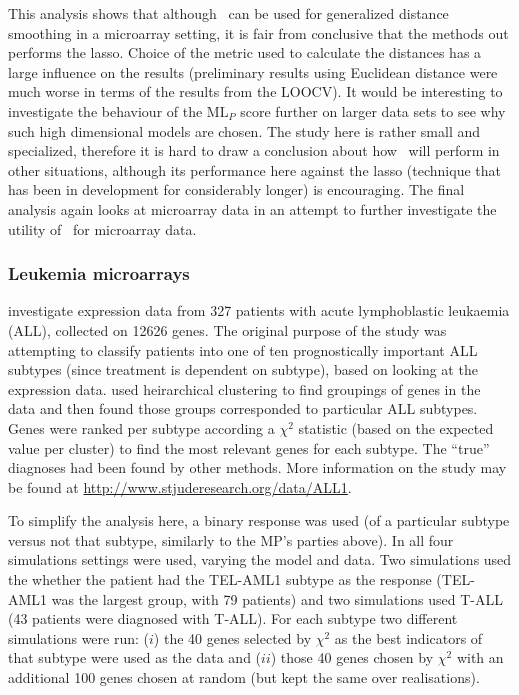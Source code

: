This analysis shows that although \mdsds\ can be used for generalized distance smoothing in a microarray setting, it is fair from conclusive that the methods out performs the lasso. Choice of the metric used to calculate the distances has a large influence on the results (preliminary results using Euclidean distance were much worse in terms of the results from the LOOCV). It would be interesting to investigate the behaviour of the $\text{ML}_P$ score further on larger data sets to see why such high dimensional models are chosen. The study here is rather small and specialized, therefore it is hard to draw a conclusion about how \mdsds\ will perform in other situations, although its performance here against the lasso (technique that has been in development for considerably longer) is encouraging. The final analysis again looks at microarray data in an attempt to further investigate the utility of \mdsds\ for microarray data.

\subsubsection{Leukemia microarrays}

 investigate expression data from 327 patients with acute lymphoblastic leukaemia (ALL), collected on 12626 genes. The original purpose of the study was attempting to classify patients into one of ten prognostically important ALL subtypes (since treatment is dependent on subtype), based on looking at the expression data.  used heirarchical clustering to find groupings of genes in the data and then found those groups corresponded to particular ALL subtypes. Genes were ranked per subtype according a $\chi^2$ statistic (based on the expected value per cluster) to find the most relevant genes for each subtype. The ``true'' diagnoses had been found by other methods. More information on the study may be found at \url{http://www.stjuderesearch.org/data/ALL1}.

To simplify the analysis here, a binary response was used (of a particular subtype versus not that subtype, similarly to the MP's parties above). In all four simulations settings were used, varying the model and data. Two simulations used the whether the patient had the TEL-AML1 subtype as the response (TEL-AML1 was the largest group, with 79 patients) and two simulations used T-ALL (43 patients were diagnosed with T-ALL). For each subtype two different simulations were run: ($i$) the 40 genes selected by $\chi^2$ as the best indicators of that subtype were used as the data and ($ii$) those 40 genes chosen by $\chi^2$ with an additional 100 genes chosen at random (but kept the same over realisations). 

